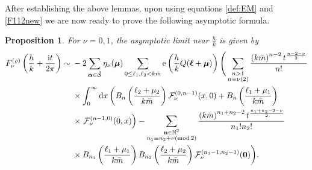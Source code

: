\documentclass[pdftex]{sigma}
\def\CF{\mathcal{F}}
\def\ss{ \tilde{\mathcal{S}} }
\def\bos{\varrho}
\def\bal{\boldsymbol{\alpha}}
\def\bmu{\boldsymbol{\mu}}
\def\bol{\boldsymbol{\ell}}
\def\ex{{\rm e}}
\def\tmod{\mathrm{mod}}
\newtheorem{prop}[thm]{Proposition}
\theoremstyle{definition}
\numberwithin{equation}{section}
\begin{document}
After establishing the above lemmas, upon using equations \eqref{def:EM} and \eqref{F112new} we are now ready to prove the following asymptotic formula.


\begin{prop}\label{prop:Fs12asymptotics}
	For $\nu=0,1$, the asymptotic limit
 near $\tfrac{h}{k}$ is given by
	\begin{align}
				F_\nu^{(\bos)}\left(\frac{h}{k} +\frac{{\rm i}t}{2\pi}\right) \sim{}&-2
			\sum_{\bal\in\ss} \eta_\nu{(\bmu)}
			\sum_{ 0\leq \ell_1,\ell_2 < k\bar m } \ex\left(\frac{h}{k}Q(\bol+\bmu)\right) \Bigg(
			\sum_{\substack{ n> 1\\n\equiv \nu (2)} }
			\frac{ \left( k\bar{m} \right)^{n-2} t^{\frac{n-2-\nu}{2}} }{n!}\nonumber\\
			&\times\int_0^\infty {\rm d}x \left( B_{n}\left(\frac{\ell_2+\mu_2}{k\bar{m}}\right) \CF_\nu^{(0,n-1)} (x,0) +B_{n}\left(\frac{\ell_1+\mu_1}{k\bar{m}}\right)\right.\nonumber
			\\
			&\times\left.\CF_\nu^{(n-1,0)} (0,x) \right) -
			\sum_{ \substack{ \mathbf{n}\in\mathbb{N}^2 \\ n_1 \equiv n_2 +\nu (\tmod\, 2) }}
			\frac{\left( k\bar{m}\right)^{n_1+n_2-2} t^{\frac{n_1+n_2-2-\nu}{2}} }{n_1! n_2!}\nonumber\\
&\times B_{n_1}\left(\frac{\ell_1+\mu_1}{k\bar{m}}\right)B_{n_2}\left(\frac{\ell_2+\mu_2}{k\bar{m}}\right)\CF_\nu^{(n_1-1,n_2-1)} (\boldsymbol{0}) \bigg) .\label{def:F11new-2}
\end{align}
\end{prop}
\end{document}
